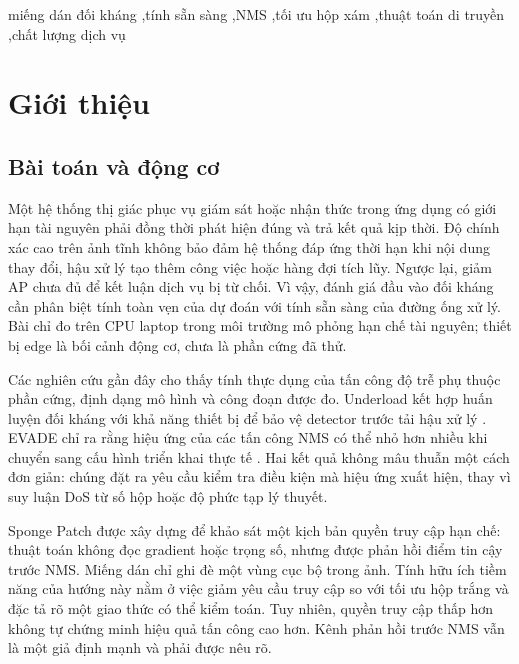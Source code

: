 \documentclass[a4paper,fleqn]{cas-dc}
\newif\ifbranchB
\begin{document}
\begin{keywords}[Từ khóa]
miếng dán đối kháng \sep tính sẵn sàng \sep NMS \sep tối ưu hộp xám \sep thuật toán di truyền \sep chất lượng dịch vụ\ifbranchB\sep phát hiện người\fi
\end{keywords}
\maketitle

\section{Giới thiệu}

\subsection{Bài toán và động cơ}

Một hệ thống thị giác phục vụ giám sát hoặc nhận thức trong ứng dụng có giới hạn tài nguyên phải đồng thời phát hiện đúng và trả kết quả kịp thời. Độ chính xác cao trên ảnh tĩnh không bảo đảm hệ thống đáp ứng thời hạn khi nội dung thay đổi, hậu xử lý tạo thêm công việc hoặc hàng đợi tích lũy. Ngược lại, giảm AP chưa đủ để kết luận dịch vụ bị từ chối. Vì vậy, đánh giá đầu vào đối kháng cần phân biệt tính toàn vẹn của dự đoán với tính sẵn sàng của đường ống xử lý. Bài chỉ đo trên CPU laptop trong môi trường mô phỏng hạn chế tài nguyên; thiết bị edge là bối cảnh động cơ, chưa là phần cứng đã thử.

Các nghiên cứu gần đây cho thấy tính thực dụng của tấn công độ trễ phụ thuộc phần cứng, định dạng mô hình và công đoạn được đo. Underload kết hợp huấn luyện đối kháng với khả năng thiết bị để bảo vệ detector trước tải hậu xử lý \cite{underload2025}. EVADE chỉ ra rằng hiệu ứng của các tấn công NMS có thể nhỏ hơn nhiều khi chuyển sang cấu hình triển khai thực tế \cite{evade2025}. Hai kết quả không mâu thuẫn một cách đơn giản: chúng đặt ra yêu cầu kiểm tra điều kiện mà hiệu ứng xuất hiện, thay vì suy luận DoS từ số hộp hoặc độ phức tạp lý thuyết.

Sponge Patch được xây dựng để khảo sát một kịch bản quyền truy cập hạn chế: thuật toán không đọc gradient hoặc trọng số, nhưng được phản hồi điểm tin cậy trước NMS. Miếng dán chỉ ghi đè một vùng cục bộ trong ảnh. Tính hữu ích tiềm năng của hướng này nằm ở việc giảm yêu cầu truy cập so với tối ưu hộp trắng và đặc tả rõ một giao thức có thể kiểm toán. Tuy nhiên, quyền truy cập thấp hơn không tự chứng minh hiệu quả tấn công cao hơn. Kênh phản hồi trước NMS vẫn là một giả định mạnh và phải được nêu rõ.
\end{document}
